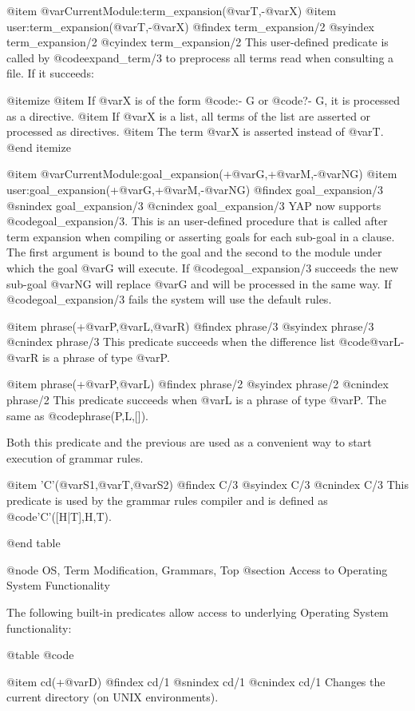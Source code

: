 {{{{{{@item @var{CurrentModule}:term_expansion(@var{T},-@var{X})
@item user:term_expansion(@var{T},-@var{X})
@findex term_expansion/2
@syindex term_expansion/2
@cyindex term_expansion/2
This user-defined predicate is called by @code{expand_term/3} to
preprocess all terms read when consulting a file. If it succeeds:

@itemize
@item
If @var{X} is of the form @code{:- G} or @code{?- G}, it is processed as
a directive.
@item
If @var{X} is a list, all terms of the list are asserted or processed
as directives.
@item The term @var{X} is asserted instead of @var{T}.
@end itemize

@item @var{CurrentModule}:goal_expansion(+@var{G},+@var{M},-@var{NG})
@item user:goal_expansion(+@var{G},+@var{M},-@var{NG})
@findex goal_expansion/3
@snindex goal_expansion/3
@cnindex goal_expansion/3
YAP now supports @code{goal_expansion/3}. This is an user-defined
procedure that is called after term expansion when compiling or
asserting goals for each sub-goal in a clause. The first argument is
bound to the goal and the second to the module under which the goal
@var{G} will execute. If @code{goal_expansion/3} succeeds the new
sub-goal @var{NG} will replace @var{G} and will be processed in the same
way. If @code{goal_expansion/3} fails the system will use the default
rules.

@item phrase(+@var{P},@var{L},@var{R})
@findex phrase/3
@syindex phrase/3
@cnindex phrase/3
This predicate succeeds when the difference list @code{@var{L}-@var{R}}
is a phrase of type @var{P}.

@item phrase(+@var{P},@var{L})
@findex phrase/2
@syindex phrase/2
@cnindex phrase/2
This predicate succeeds when @var{L} is a phrase of type @var{P}. The
same as @code{phrase(P,L,[])}.

Both this predicate and the previous are used as a convenient way to
start execution of grammar rules.

@item 'C'(@var{S1},@var{T},@var{S2})
@findex C/3
@syindex C/3
@cnindex C/3
This predicate is used by the grammar rules compiler and is defined as
@code{'C'([H|T],H,T)}.

@end table

@node OS, Term Modification, Grammars, Top
@section Access to Operating System Functionality

The following built-in predicates allow access to underlying
Operating System functionality: 

@table @code

@item cd(+@var{D})
@findex cd/1
@snindex cd/1
@cnindex cd/1
Changes the current directory (on UNIX environments).

}}}}}}
